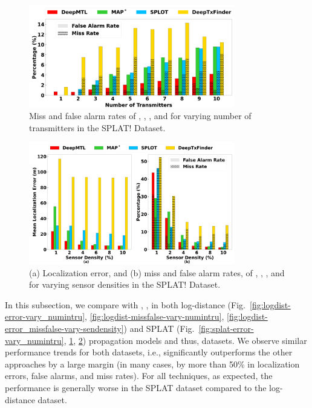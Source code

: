 \begin{figure}[ht]
	\centering
	\includegraphics[width=0.8\textwidth]{chapters/wowmom-pmc/figures/splat-missfalse_vary_numintru.png}
	\caption{Miss and false alarm rates of \our, \map, \splot, and \deeptx for varying number of transmitters in the SPLAT! Dataset.}
	\label{fig:splat-missfalse-vary-numintru}
\end{figure}


\begin{figure}[ht]
	\centering
	\includegraphics[width=0.8\textwidth]{chapters/wowmom-pmc/figures/splat-error_missfalse_vary_sendensity.png}
	\caption{(a) Localization error, and (b) miss and false alarm rates, of \our, \map, \splot, and \deeptx for varying sensor densities in the SPLAT! Dataset.}
	\label{fig:splat-error-vary-sendensity}
\end{figure}



In this subsection, we compare \our with \splot, \map, \deeptx in both log-distance (Fig.~\ref{fig:logdist-error-vary_numintru}, \ref{fig:logdist-missfalse-vary-numintru}, \ref{fig:logdist-error_missfalse-vary-sendensity}) and SPLAT (Fig.~\ref{fig:splat-error-vary_numintru}, \ref{fig:splat-missfalse-vary-numintru}, \ref{fig:splat-error-vary-sendensity}) propagation models and thus, datasets.
We observe similar performance trends for both datasets, i.e., 
\our significantly outperforms the other approaches by a large margin (in many cases, by more
than 50\% in localization errors, false alarms, and miss rates). For all techniques, as expected,
the performance is generally worse in the SPLAT dataset compared to the log-distance dataset.

